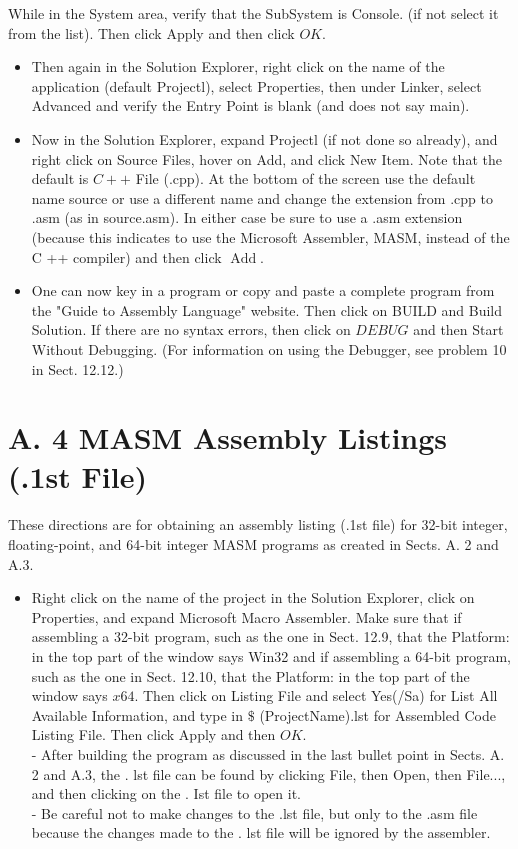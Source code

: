 \documentclass[10pt]{book}
\begin{document}
\begin{center}
\begin{center}
\begin{center}
\begin{center}
\begin{center}
While in the System area, verify that the SubSystem is Console. (if not select it from the list). Then click Apply and then click $O K$.

\begin{itemize}
  \item Then again in the Solution Explorer, right click on the name of the application (default Projectl), select Properties, then under Linker, select Advanced and verify the Entry Point is blank (and does not say main).
  \item Now in the Solution Explorer, expand Projectl (if not done so already), and right click on Source Files, hover on Add, and click New Item. Note that the default is $C++$ File (.cpp). At the bottom of the screen use the default name source or use a different name and change the extension from .cpp to .asm (as in source.asm). In either case be sure to use a .asm extension (because this indicates to use the Microsoft Assembler, MASM, instead of the C ++ compiler) and then click $\operatorname{Add}$.
  \item One can now key in a program or copy and paste a complete program from the "Guide to Assembly Language" website. Then click on BUILD and Build Solution. If there are no syntax errors, then click on $D E B U G$ and then Start Without Debugging. (For information on using the Debugger, see problem 10 in Sect. 12.12.)
\end{itemize}

\section*{A. 4 MASM Assembly Listings (.1st File)}
These directions are for obtaining an assembly listing (.1st file) for 32-bit integer, floating-point, and 64-bit integer MASM programs as created in Sects. A. 2 and A.3.

\begin{itemize}
  \item Right click on the name of the project in the Solution Explorer, click on Properties, and expand Microsoft Macro Assembler. Make sure that if assembling a 32-bit program, such as the one in Sect. 12.9, that the Platform: in the top part of the window says Win32 and if assembling a 64-bit program, such as the one in Sect. 12.10, that the Platform: in the top part of the window says $x 64$. Then click on Listing File and select Yes(/Sa) for List All Available Information, and type in $\$$ (ProjectName).lst for Assembled Code Listing File. Then click Apply and then $O K$.\\
- After building the program as discussed in the last bullet point in Sects. A. 2 and A.3, the . lst file can be found by clicking File, then Open, then File..., and then clicking on the . Ist file to open it.\\
- Be careful not to make changes to the .lst file, but only to the .asm file because the changes made to the . lst file will be ignored by the assembler.
\end{itemize}


\end{center}
\end{center}
\end{center}
\end{center}
\end{center}
\end{document}
